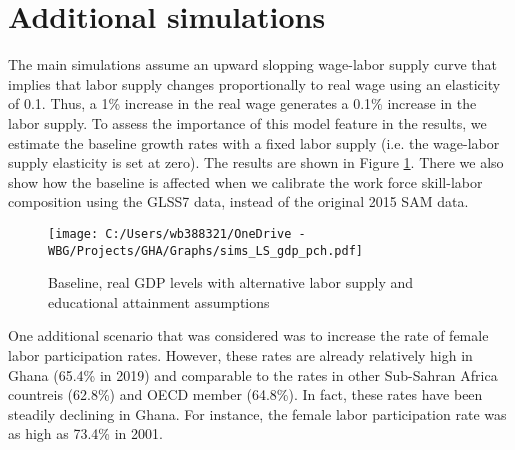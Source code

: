 \documentclass[11pt,english]{article}
\begin{document}
\clearpage

\section{Additional simulations}

The main simulations assume an upward slopping wage-labor supply curve that implies that labor supply changes proportionally to real wage using an elasticity of 0.1. Thus, a 1\% increase in the real wage generates a 0.1\% increase in the labor supply. To assess the importance of this model feature in the results, we estimate the baseline growth rates with a fixed labor supply (i.e. the wage-labor supply elasticity is set at zero). The results are shown in Figure \ref{fig_sim_LS_gdp_pch}. There we also show how the baseline is affected when we calibrate the work force skill-labor composition using the GLSS7 data, instead of the original 2015 SAM data.

\begin{figure}[ht!]\caption{Baseline, real GDP levels with alternative labor supply and educational attainment assumptions} \label{fig_sim_LS_gdp_pch}
	\centering
	\texttt{[image: C:/Users/wb388321/OneDrive - WBG/Projects/GHA/Graphs/sims\_LS\_gdp\_pch.pdf]}
\end{figure}

One additional scenario that was considered was to increase the rate of female labor participation rates. However, these rates are already relatively high in Ghana (65.4\% in 2019) and comparable to the rates in other Sub-Sahran Africa countreis  (62.8\%) and OECD member (64.8\%). In fact, these rates have been steadily declining in Ghana. For instance, the female labor participation rate was as high as 73.4\% in 2001.
\end{document}
